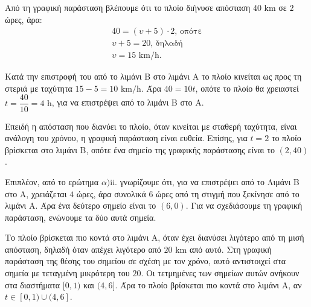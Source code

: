 
\begin{alist}
\item
\begin{rlist}
\item Από τη γραφική παράσταση βλέπουμε ότι το πλοίο διήνυσε απόσταση $40\text{ km}$ σε $2$
ώρες, άρα:
\begin{gather*}
40 = (\upsilon + 5) \cdot 2\text{, οπότε} \\
\upsilon + 5 = 20\text{, δηλαδή} \\
\upsilon = 15\text{ km/h}.
\end{gather*}
\item Κατά την επιστροφή του από το λιμάνι Β στο λιμάνι Α το πλοίο κινείται ως προς τη
στεριά με ταχύτητα $15 - 5 = 10\text{ km/h}$. Άρα $40 = 10t$, οπότε το πλοίο θα χρειαστεί
$t = \dfrac{40}{10} = 4\text{ h}$, για να επιστρέψει από το λιμάνι Β στο Α.
\end{rlist}

\item
\begin{rlist}
\item Επειδή η απόσταση που διανύει το πλοίο, όταν κινείται με σταθερή ταχύτητα, είναι
ανάλογη του χρόνου, η γραφική παράσταση είναι ευθεία. Επίσης, για $t = 2$ το πλοίο
βρίσκεται στο λιμάνι Β, οπότε ένα σημείο της γραφικής παράστασης είναι το $(2, 40)$.

Επιπλέον, από το ερώτημα $\alpha)$ii. γνωρίζουμε ότι, για να επιστρέψει από το Λιμάνι Β
στο Α, χρειάζεται $4$ ώρες, άρα συνολικά $6$ ώρες από τη στιγμή που ξεκίνησε από το
λιμάνι Α. Άρα ένα δεύτερο σημείο είναι το $(6, 0)$. Για να σχεδιάσουμε τη γραφική
παράσταση, ενώνουμε τα δύο αυτά σημεία.

\item Το πλοίο βρίσκεται πιο κοντά στο λιμάνι Α, όταν έχει διανύσει λιγότερο από τη μισή
απόσταση, δηλαδή όταν απέχει λιγότερο από $20\text{ km}$ από αυτό. Στη γραφική
παράσταση της θέσης του σημείου σε σχέση με τον χρόνο, αυτό αντιστοιχεί στα
σημεία με τεταγμένη μικρότερη του $20$. Οι τετμημένες των σημείων αυτών ανήκουν
στα διαστήματα $[0, 1)$ και $(4, 6]$. Άρα το πλοίο βρίσκεται πιο κοντά στο λιμάνι Α, αν
$t \in [0, 1) \cup (4, 6]$.
\end{rlist}
\end{alist}

